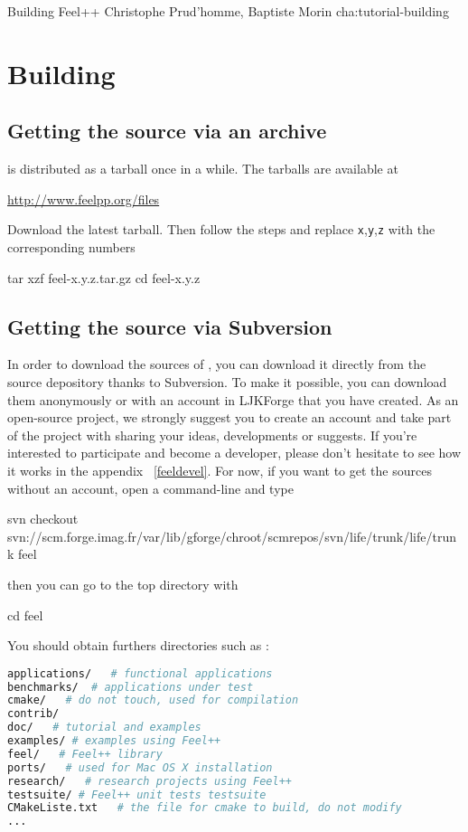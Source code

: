             {Building Feel++}
            {Christophe Prud'homme, Baptiste Morin}
            {cha:tutorial-building}

\section{Building \feel}

\subsection{Getting the source via an archive}
\label{sec:getting-source-via-1}

\feel is distributed as a tarball once in a while. The tarballs are available
at
\begin{center}
  \href{http://www.feelpp.org/files}{http://www.feelpp.org/files}
\end{center}
Download the latest tarball. Then follow the steps and replace
\texttt{x},\texttt{y},\texttt{z} with the corresponding numbers

\begin{unixcom}
  tar xzf feel-x.y.z.tar.gz
  cd feel-x.y.z
\end{unixcom}


\subsection{Getting the source via Subversion}
\label{sec:getting-source-via}
In order to download the sources of \feel, you can download it directly from the source depository thanks to Subversion. To make it possible, you can download them anonymously or with an account in LJKForge that you have created. As an open-source project, we strongly suggest you to create an account and take part of the project with sharing your ideas, developments or suggests. If you're interested to participate and become a \feel developer, please don't hesitate to see how it works in the appendix ~\ref{feeldevel}. For now, if you want to get the sources without an account, open a command-line and type
\begin{unixcom}
		svn checkout svn://scm.forge.imag.fr/var/lib/gforge/chroot/scmrepos/svn/life/trunk/life/trunk feel
\end{unixcom}
then you can go to the \feel top directory with
\begin{unixcom}
		cd feel
\end{unixcom}
You should obtain furthers directories such as :
\begin{lstlisting}[language=sh]
applications/   # functional applications
benchmarks/  # applications under test
cmake/   # do not touch, used for compilation
contrib/
doc/   # tutorial and examples
examples/ # examples using Feel++
feel/   # Feel++ library
ports/   # used for Mac OS X installation
research/   # research projects using Feel++
testsuite/ # Feel++ unit tests testsuite
CMakeListe.txt   # the file for cmake to build, do not modify
...
\end{lstlisting}

